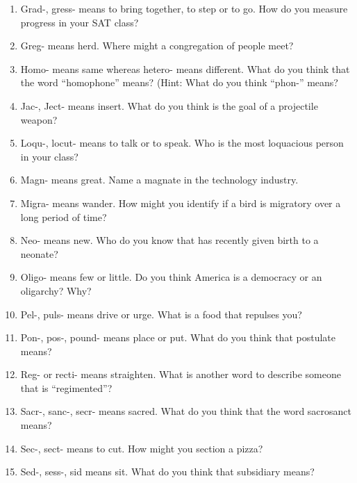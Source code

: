 \begin{enumerate}
\item Grad-, gress- means to bring together, to step or to go. How do you measure progress in your SAT class? \hrulefill

\item Greg- means herd. Where might a congregation of people meet? \hrulefill

\item Homo- means same whereas hetero- means different. What do you think that the word ``homophone'' means? \hrulefill (Hint: What do you think ``phon-'' means? \hrulefill

\item Jac-, Ject- means insert. What do you think is the goal of a projectile weapon? \hrulefill

\item Loqu-, locut- means to talk or to speak. Who is the most loquacious person in your class? \hrulefill

\item Magn- means great. Name a magnate in the technology industry. \hrulefill

\item Migra- means wander. How might you identify if a bird is migratory over a long period of time? \hrulefill

\item Neo- means new. Who do you know that has recently given birth to a neonate? \hrulefill

\item Oligo- means few or little. Do you think America is a democracy or an oligarchy? Why? \hrulefill

\item Pel-, puls- means drive or urge. What is a food that repulses you? \hrulefill

\item  Pon-, pos-, pound- means place or put. What do you think that postulate means? \hrulefill

\item Reg- or recti- means straighten. What is another word to describe someone that is ``regimented''? \hrulefill

\item Sacr-, sanc-, secr- means sacred. What do you think that the word sacrosanct means? \hrulefill

 \item  Sec-, sect- means to cut. How might you section a pizza? \hrulefill

 \item Sed-, sess-, sid means sit. What do you think that subsidiary means? \hrulefill
 
 \end{enumerate}